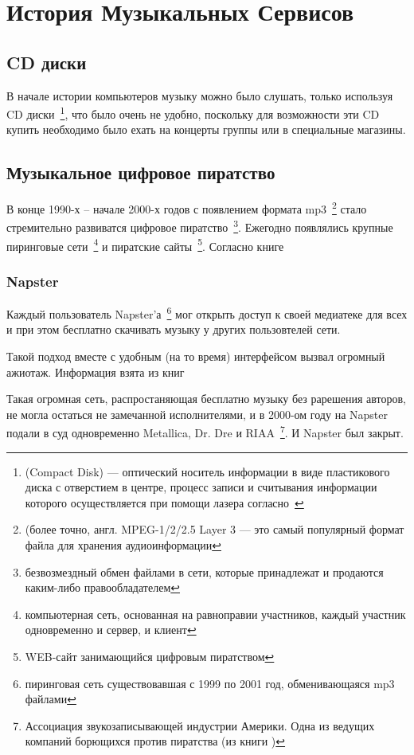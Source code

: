 \chapter{История Музыкальных Сервисов}
\label{cha:ch_1}

\section{CD диски}

В начале истории компьютеров музыку можно было слушать, только используя CD диски~\footnote{(Compact Disk) --- оптический носитель информации в виде пластикового диска с отверстием в центре, процесс записи и считывания информации которого осуществляется при помощи лазера согласно~\cite{cd}}, что было очень не удобно, поскольку для возможности эти CD купить необходимо было ехать на концерты группы или в специальные магазины.

\section{Музыкальное цифровое пиратство}

В конце 1990-х -- начале 2000-х годов с появлением формата mp3~\footnote{(более точно, англ. MPEG-1/2/2.5 Layer 3 — это самый популярный формат файла для хранения аудиоинформации} стало стремительно развиватся цифровое пиратство~\footnote{безвозмездный обмен файлами в сети, которые принадлежат и продаются каким-либо правообладателем}.  Ежегодно появлялись крупные пиринговые сети~\footnote{компьютерная сеть, основанная на равноправии участников, каждый участник одновременно и сервер, и клиент} и пиратские сайты~\footnote{WEB-сайт занимающийся цифровым пиратством}.  Согласно книге~\cite{piracy}

\subsection{Napster}

Каждый пользователь Napster'а~\footnote{пиринговая сеть существовавшая с 1999 по 2001 год, обменивающаяся mp3 файлами} мог открыть доступ к своей медиатеке для всех и при этом бесплатно скачивать музыку у других пользовтелей сети.

Такой подход вместе с удобным (на то время) интерфейсом вызвал огромный ажиотаж.  Информация взята из книг~\cite{napster,piracy}

Такая огромная сеть, распростаняющая бесплатно музыку без рарешения авторов, не могла остаться не замечанной исполнителями, и в 2000-ом году на Napster подали в суд одновременно Metallica, Dr. Dre и RIAA~\footnote{Ассоциация звукозаписывающей индустрии Америки.  Одна из ведущих компаний борющихся против пиратства (из книги \cite{piracy})}. И Napster был закрыт.

